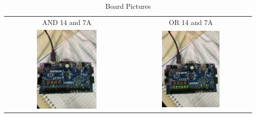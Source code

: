 \documentclass[11pt]{article}
\begin{document}
\begin{table}[h]\centering
	\begin{tabular}{cc}
		AND 14 and 7A & OR 14 and 7A \\
		\includegraphics [width=0.5\textwidth,trim=0 0 0 0, clip, angle = 270]{AND} &
		\includegraphics [width=0.5\textwidth,trim=0 0 0 0, clip, angle = 270]{OR} \\
	\end{tabular}
	\caption{Board Pictures}
	\label{fig:sim_with_table}
\end{table}
\end{document}
